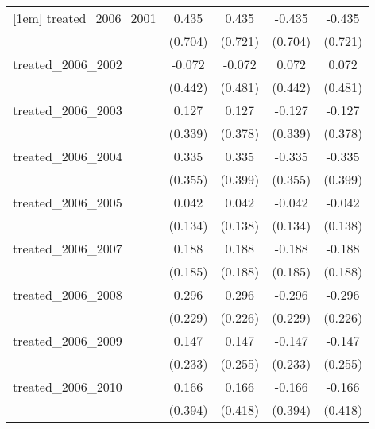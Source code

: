 {\begin{tabular}{l*{4}{c}}
[1em]
treated\_2006\_2001&       0.435         &       0.435         &      -0.435         &      -0.435         \\
            &     (0.704)         &     (0.721)         &     (0.704)         &     (0.721)         \\
[1em]
treated\_2006\_2002&      -0.072         &      -0.072         &       0.072         &       0.072         \\
            &     (0.442)         &     (0.481)         &     (0.442)         &     (0.481)         \\
[1em]
treated\_2006\_2003&       0.127         &       0.127         &      -0.127         &      -0.127         \\
            &     (0.339)         &     (0.378)         &     (0.339)         &     (0.378)         \\
[1em]
treated\_2006\_2004&       0.335         &       0.335         &      -0.335         &      -0.335         \\
            &     (0.355)         &     (0.399)         &     (0.355)         &     (0.399)         \\
[1em]
treated\_2006\_2005&       0.042         &       0.042         &      -0.042         &      -0.042         \\
            &     (0.134)         &     (0.138)         &     (0.134)         &     (0.138)         \\
[1em]
treated\_2006\_2007&       0.188         &       0.188         &      -0.188         &      -0.188         \\
            &     (0.185)         &     (0.188)         &     (0.185)         &     (0.188)         \\
[1em]
treated\_2006\_2008&       0.296         &       0.296         &      -0.296         &      -0.296         \\
            &     (0.229)         &     (0.226)         &     (0.229)         &     (0.226)         \\
[1em]
treated\_2006\_2009&       0.147         &       0.147         &      -0.147         &      -0.147         \\
            &     (0.233)         &     (0.255)         &     (0.233)         &     (0.255)         \\
[1em]
treated\_2006\_2010&       0.166         &       0.166         &      -0.166         &      -0.166         \\
            &     (0.394)         &     (0.418)         &     (0.394)         &     (0.418)         \\

\end{tabular}}

